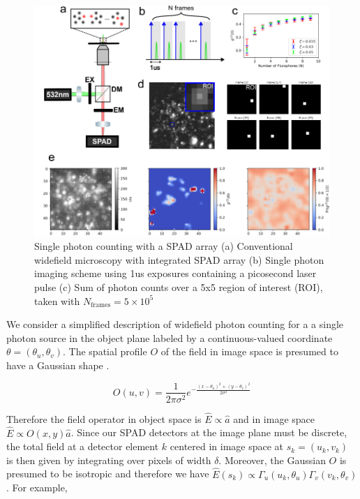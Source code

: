 \documentclass[a4paper, twocolumn, superscriptaddress,prl]{revtex4}  %
\begin{document}
\begin{figure}
\includegraphics[width=14cm]{media/Figure-0.png}
\caption{Single photon counting with a SPAD array (a) Conventional widefield microscopy with integrated SPAD array (b) Single photon imaging scheme using 1us exposures containing a picosecond laser pulse (c) Sum of photon counts over a 5x5 region of interest (ROI), taken with $N_{\mathrm{frames}}=5\times 10^{5}$}
\end{figure}    

We consider a simplified description of widefield photon counting for a a single photon source in the object plane labeled by a continuous-valued coordinate $\theta=(\theta_{u},\theta_{v})$. The spatial profile $O$ of the field in image space is presumed to have a Gaussian shape \citep{Zhang2007,Richards1959,Gibson1989}.

\begin{equation}
O(u,v) = \frac{1}{2\pi\sigma^{2}}e^{-\frac{(x-\theta_{u})^2+(y-\theta_{v})^2}{2\sigma^2}}
\end{equation}

Therefore the field operator in object space is $\hat{E} \propto \hat{a}$ and in image space $\hat{E} \propto O(x,y)\hat{a}$. Since our SPAD detectors at the image plane must be discrete, the total field at a detector element $k$ centered in image space at $s_k=(u_k,v_k)$ is then given by integrating over pixels of width $\delta$. Moreover, the Gaussian $O$ is presumed to be isotropic and therefore we have $\hat{E}(s_k) \propto \Gamma_{u}(u_k,\theta_{u})\Gamma_{v}(v_k,\theta_{v})$. For example,
\end{document}
